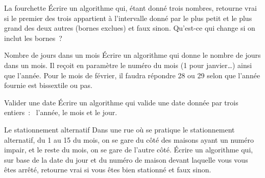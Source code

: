 	\begin{Exercice}{La fourchette}
		Écrire un algorithme qui, étant donné trois nombres, 
		retourne vrai si le premier des trois 
		appartient à l’intervalle donné par le plus petit et le plus grand 
		des deux autres (bornes exclues) et faux sinon. 
		Qu’est-ce qui change si on inclut les bornes~?
	\end{Exercice}

	\begin{Exercice}{Nombre de jours dans un mois}
		Écrire un algorithme qui donne le nombre de jours dans un mois.
		Il reçoit en paramètre le numéro du mois (1 pour janvier\dots)
		ainsi que l'année.
		Pour le mois de février, 
		il faudra répondre 28 ou 29 selon que l'année fournie
		est bissextile ou pas.
	\end{Exercice}

	\begin{Exercice}{Valider une date}
		Écrire un algorithme qui valide 
		une date donnée par trois entiers~:~ l’année, le mois et le jour.
	\end{Exercice}
	
	\begin{Exercice}{Le stationnement alternatif}
		Dans une rue où se pratique le stationnement alternatif, 
		du 1 au 15 du mois, on se gare du côté des maisons ayant un numéro impair, 
		et le reste du mois, on se gare de l’autre côté. 
		Écrire un algorithme qui, sur base de la date du jour et du numéro de maison
		devant laquelle vous vous êtes arrêté, 
		retourne vrai si vous êtes bien stationné et faux sinon.
	\end{Exercice}
	

